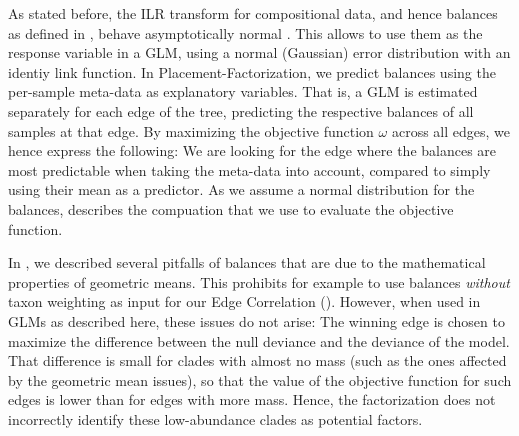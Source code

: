 As stated before, the ILR transform for compositional data,
and hence balances as defined in ,
behave asymptotically normal \cite{Egozcue2003,Pawlowsky-Glahn2011a}.
This allows to use them as the response variable in a \ac{GLM},
using a normal (Gaussian) error distribution with an identiy link function.
In Placement-Factorization, we predict balances using the per-sample meta-data as explanatory variables.
That is, a \ac{GLM} is estimated separately for each edge of the tree,
predicting the respective balances of all samples at that edge.
By maximizing the objective function $\omega$ across all edges, we hence express the following:
We are looking for the edge where the balances are most predictable when taking the meta-data into account,
compared to simply using their mean as a predictor.
As we assume a normal distribution for the balances,
 describes the compuation that we use to evaluate the objective function.

In , we described several pitfalls of balances
that are due to the mathematical properties of geometric means.
This prohibits for example to use balances \emph{without} taxon weighting
as input for our Edge Correlation ().
However, when used in \acp{GLM} as described here, these issues do not arise:
The winning edge is chosen to maximize the difference between the null deviance and the deviance of the model.
That difference is small for clades with almost no mass (such as the ones affected by the geometric mean issues),
so that the value of the objective function for such edges is lower than for edges with more mass.
Hence, the factorization does not incorrectly identify these low-abundance clades as potential factors.



